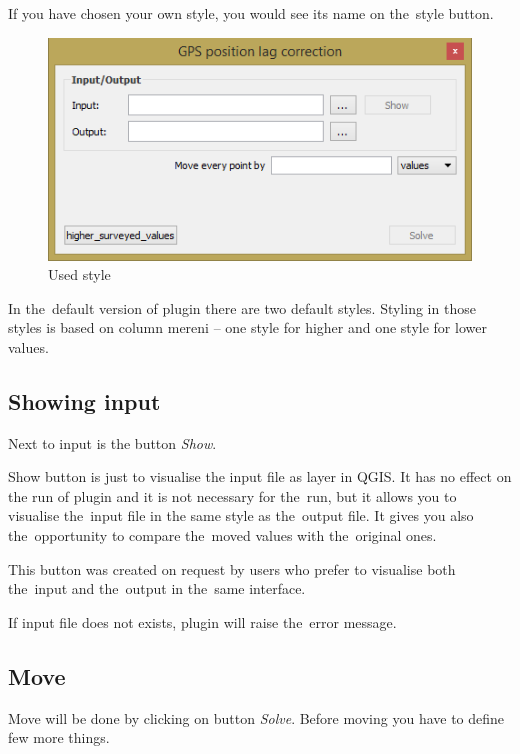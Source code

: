If you have chosen your own style, you would see its name on the~style button. 

  \begin{figure}[H]
   \centering
	\includegraphics[scale=0.75]{./pictures/style-defined.png}
	\caption[Used style]{Used style}
      \label{fig:used-style}
  \end{figure}

In the~default version of plugin there are two default styles. Styling in those styles is based on
column mereni – one style for higher and one style for lower values. 

\subsection{Showing input}
\label{show}

Next to input is the button \textit{Show}. 

Show button is just to visualise the input file as layer in QGIS. It has no effect on the run of plugin
and it is not necessary for the~run, but it allows you to visualise the~input file in the same style as
the~output file. It gives you also the~opportunity to compare the~moved values with the~original ones. 

This button was created on request by users who prefer to visualise both the~input and the~output in
the~same interface. 

If input file does not exists, plugin will raise the~error message. 

\subsection{Move}
\label{move}

Move will be done by clicking on button \textit{Solve}. Before moving you have to define few more things. 

